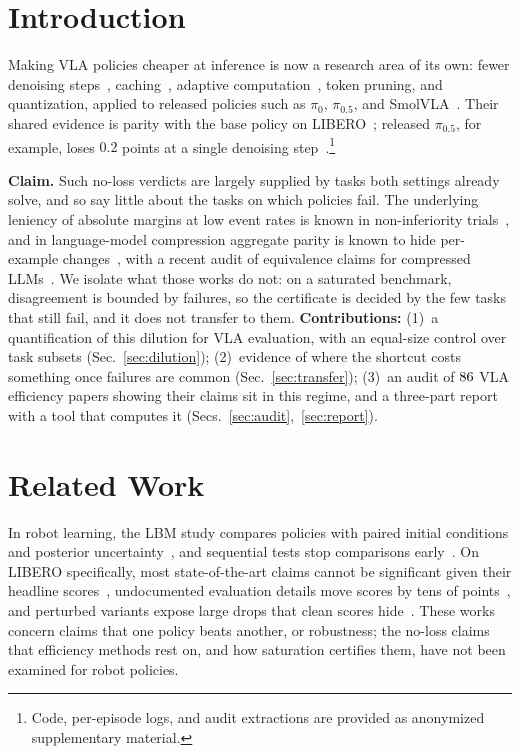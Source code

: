 \documentclass[conference]{IEEEtran}
\newif\ifanon \anontrue %
\begin{document}
\section{Introduction}
Making VLA policies cheaper at inference is now a research area of its
own: fewer denoising steps~\cite{snapflow2026,chen2026simple},
caching~\cite{oi2026actioncache}, adaptive computation~\cite{han2026adavla},
token pruning, and quantization, applied to released policies such as
$\pi_0$, $\pi_{0.5}$, and SmolVLA~\cite{black2024pi0,pi05,shukor2025smolvla}.
Their shared evidence is parity with the base policy on
LIBERO~\cite{liu2023libero}; released $\pi_{0.5}$, for example, loses
$0.2$ points at a single denoising step~\cite{oi2026actioncache}.\footnote{\ifanon Code, per-episode logs, and audit extractions are provided as anonymized supplementary material.\else Per-episode logs, audit extractions, and code: \url{https://github.com/nihalgunu/roborigor}\fi}

\textbf{Claim.} Such no-loss verdicts are largely supplied by tasks both
settings already solve, and so say little about the tasks on which
policies fail. The underlying leniency of absolute margins at low event
rates is known in non-inferiority trials~\cite{quartagno2020,redfors2024},
and in language-model compression aggregate parity is known to hide
per-example changes~\cite{dutta2024accuracy,hooker2019forget,kubler2026degradations},
with a recent audit of equivalence claims for compressed
LLMs~\cite{singh2026certifying}. We isolate what those works do not:
on a saturated benchmark, disagreement is bounded by failures, so the
certificate is decided by the few tasks that still fail, and it does not
transfer to them. \textbf{Contributions:} (1)~a quantification of this
dilution for VLA evaluation, with an equal-size control over task
subsets (Sec.~\ref{sec:dilution}); (2)~evidence of where the shortcut
costs something once failures are common (Sec.~\ref{sec:transfer});
(3)~an audit of $86$ VLA efficiency papers showing their claims
sit in this regime, and a three-part report with a tool that computes it
(Secs.~\ref{sec:audit},~\ref{sec:report}).

\section{Related Work}\label{sec:related}
In robot learning, the LBM study compares policies with paired initial
conditions and posterior uncertainty~\cite{lbm2026}, and sequential
tests stop comparisons early~\cite{snyder2025step}. On
LIBERO specifically, most state-of-the-art claims cannot be significant
given their headline scores~\cite{jiang2026benchmarking}, undocumented
evaluation details move scores by tens of points~\cite{choi2026vlaeval},
and perturbed variants expose large drops that clean scores
hide~\cite{fei2025liberoplus,zhou2025liberopro}. These works concern
claims that one policy beats another, or robustness; the no-loss claims
that efficiency methods rest on, and how saturation certifies them,
have not been examined for robot policies.
\end{document}
